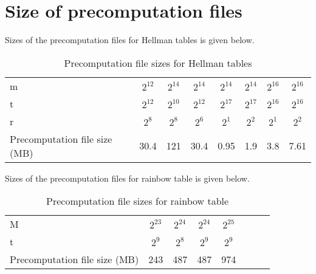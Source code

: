 \chapter{Size of precomputation files}
\label{app:size-precomp-files}

Sizes of the precomputation files for Hellman tables is given below. 
\begin{table}[ht!]
\begin{center}
\caption{Precomputation file sizes for Hellman tables}
\smallskip
\smallskip
\begin{tabular}{|p{3.5cm}||c|c|c|c|c|c|c|}
\hline
m																				&	$2^{12}$ 	&	$2^{14}$ 	&	$2^{14}$ 	&	$2^{14}$ 	&	$2^{14}$ 	&	$2^{16}$ 	&	$2^{16}$	\\ 
t	  																		&	$2^{12}$ 	&	$2^{10}$ 	&	$2^{12}$ 	&	$2^{17}$ 	&	$2^{17}$ 	&	$2^{16}$ 	&	$2^{16}$	\\ 
r	  																		&	$2^{8}$ 	&	$2^{8}$ 	&	$2^{6}$ 	&	$2^{1}$	 	&	$2^{2}$ 	&	$2^{1}$ 	&	$2^{2}$		\\ \hline \hline
Precomputation file size (MB)						&	30.4 			&	121 			&	30.4 			&	0.95			&	1.9	 			&	3.8 			&	7.61			\\ \hline
\end{tabular}
\smallskip
\end{center}
\label{tab:file-sizes-hellman}
\end{table}


\noindent Sizes of the precomputation files for rainbow table is given below. 
\begin{table}[ht!]
\begin{center}
\caption{Precomputation file sizes for rainbow table}
\smallskip
\smallskip
\begin{tabular}{|p{3.5cm}||c|c|c|c|c|c|c|}
\hline
M																				&	$2^{23}$ 	&	$2^{24}$ 	&	$2^{24}$ 	&	$2^{25}$ 	\\ 
t	  																		&	$2^{9}$ 	&	$2^{8}$ 	&	$2^{9}$ 	&	$2^{9}$ 	\\ \hline \hline 
Precomputation file size (MB)						&	243 			&	487 			&	487 			&	974				\\ \hline
\end{tabular}
\smallskip
\end{center}
\label{tab:file-sizes-rainbow}
\end{table}
